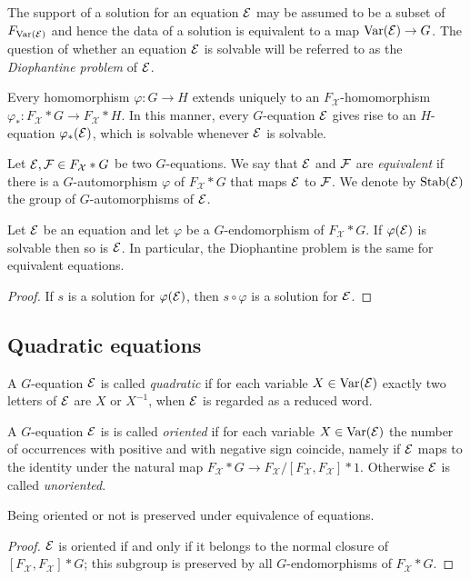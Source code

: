 \documentclass[a4paper,11pt]{amsart}
\begin{document}
The support of a solution for an equation $\mathcal{E}$ may be assumed to be
a subset of $F_{\textup{Var}(\mathcal{E})}$ and hence the data of a solution
is equivalent to a map $\textup{Var}(\mathcal{E}) \to G$.  The question of whether an
equation $\mathcal{E}$ is solvable will be referred to as the \emph{Diophantine
problem} of $\mathcal{E}$.

Every homomorphism $\varphi \colon G \to H$ extends uniquely to an
$F_{\mathcal{X}}$-homomorphism
$\varphi_* \colon F_{\mathcal{X}}*G \to F_{\mathcal{X}}*H$.  In this
manner, every $G$-equation $\mathcal{E}$ gives rise to an $H$-equation
$\varphi_*(\mathcal{E})$, which is solvable whenever $\mathcal{E}$ is solvable.

\begin{defi}
  Let $\mathcal{E},\mathcal{F}\in F_{\mathcal{X}}* G$ be two $G$-equations. We
  say that $\mathcal{E}$ and $\mathcal{F}$ are \emph{equivalent} if there is a
  $G$-automorphism $\varphi$ of $F_{\mathcal{X}}*G$ that maps $\mathcal{E}$
  to $\mathcal{F}$. We denote by $\operatorname{Stab}(\mathcal{E})$ the group of
  $G$-automorphisms of $\mathcal{E}$.
\end{defi}
\begin{lem}
  Let $\mathcal{E}$ be an equation and let $\varphi$ be a $G$-endomorphism of
  $F_{\mathcal{X}}*G$. If $\varphi(\mathcal{E})$ is solvable then so is $\mathcal{E}$. In particular,
  the Diophantine problem is the same for equivalent equations.
\end{lem}
\begin{proof}
  If $s$ is a solution for $\varphi(\mathcal{E})$, then $s\circ\varphi$ is a
  solution for $\mathcal{E}$.
\end{proof}

\subsection{Quadratic equations}
A $G$-equation $\mathcal{E}$ is called \emph{quadratic} if for each variable
$X\in \textup{Var}(\mathcal{E})$ exactly two letters of $\mathcal{E}$ are $X$ or $X^{-1}$, when
$\mathcal{E}$ is regarded as a reduced word.

A $G$-equation $\mathcal{E}$ is is called \emph{oriented} if for each variable
$X\in \textup{Var}(\mathcal{E})$ the number of occurrences with positive and with
negative sign coincide, namely if $\mathcal{E}$ maps to the identity under the
natural map $F_{\mathcal{X}}*G\to F_{\mathcal{X}}/[F_{\mathcal{X}},F_{\mathcal{X}}]*1$. 
Otherwise $\mathcal{E}$ is called \emph{unoriented}.
\begin{lem}
 Being oriented or not is preserved under equivalence of equations.
\end{lem}
\begin{proof}
  $\mathcal{E}$ is oriented if and only if it belongs to the normal closure of
  $[F_{\mathcal{X}},F_{\mathcal{X}}]*G$; this subgroup is preserved by all $G$-endomorphisms
  of $F_{\mathcal{X}}*G$.
\end{proof}
\end{document}
